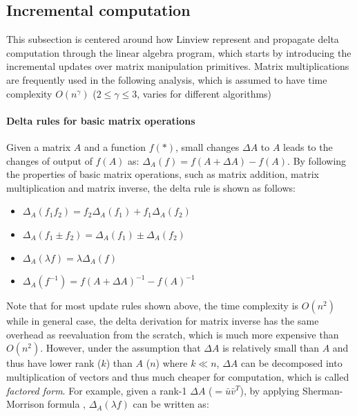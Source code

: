 \subsection{Incremental computation}
This subsection is centered around how Linview represent and propagate delta computation through the linear algebra program, which starts by introducing the incremental updates over matrix manipulation primitives. Matrix multiplications are frequently used in the following analysis, which is assumed to have time complexity $O(n^{\gamma})$ ($2\leq \gamma \leq 3$, varies for different algorithms)

\paragraph{Delta rules for basic matrix operations}
Given a matrix $A$ and a function $f(*)$, small changes $\Delta A$ to $A$ leads to the changes of output of $f(A)$ as: $\Delta_A(f) = f(A+\Delta A) - f(A)$. By following the properties of basic matrix operations, such as matrix addition, matrix multiplication and matrix inverse, the delta rule is shown as follows:

\begin{center}
    \begin{minipage}{0.4\textwidth}
      \begin{itemize}
        \item $\Delta_A(f_1 f_2) = f_2\Delta_A(f_1) + f_1\Delta_A(f_2)$
        \item $\Delta_A(f_1 \pm f_2) = \Delta_A(f_1) \pm \Delta_A(f_2)$
        \item $\Delta_A(\lambda f) = \lambda \Delta_A(f)$
        \item $\Delta_A(f^{-1}) = f(A+\Delta A)^{-1}-f(A)^{-1}$
      \end{itemize}
    \end{minipage}
  \end{center}

Note that for most update rules shown above, the time complexity is $O(n^2)$ while in general case, the delta derivation for matrix inverse has the same overhead as reevaluation from the scratch, which is much more expensive than $O(n^2)$. However, under the assumption that $\Delta A$ is relatively small than $A$ and thus have lower rank ($k$) than $A$ ($n$) where $k \ll n$, $\Delta A$ can be decomposed into multiplication of vectors and thus much cheaper for computation, which is called {\em factored form}. For example, given a rank-1 $\Delta A$ ($=\bar{u}\bar{v}^T$), by applying Sherman-Morrison formula \cite{press2007numerical}, $\Delta_A(\lambda f)$ can be written as:

